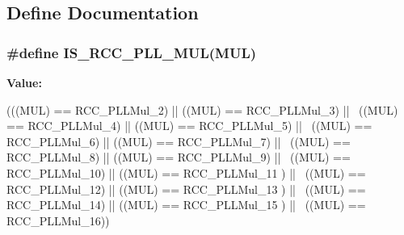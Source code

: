 \subsection{Define Documentation}
\hypertarget{group__PLL__multiplication__factor_gaad04edea77632618678f528dcb2b0cd5}{
\subsubsection[{IS\_\-RCC\_\-PLL\_\-MUL}]{\setlength{\rightskip}{0pt plus 5cm}\#define IS\_\-RCC\_\-PLL\_\-MUL(MUL)}}
\label{group__PLL__multiplication__factor_gaad04edea77632618678f528dcb2b0cd5}
{\bfseries Value:}
\begin{DoxyCode}
(((MUL) == RCC_PLLMul_2) || ((MUL) == RCC_PLLMul_3)   || \
                              ((MUL) == RCC_PLLMul_4) || ((MUL) == RCC_PLLMul_5) 
        || \
                              ((MUL) == RCC_PLLMul_6) || ((MUL) == RCC_PLLMul_7) 
        || \
                              ((MUL) == RCC_PLLMul_8) || ((MUL) == RCC_PLLMul_9) 
        || \
                              ((MUL) == RCC_PLLMul_10) || ((MUL) == RCC_PLLMul_11
      ) || \
                              ((MUL) == RCC_PLLMul_12) || ((MUL) == RCC_PLLMul_13
      ) || \
                              ((MUL) == RCC_PLLMul_14) || ((MUL) == RCC_PLLMul_15
      ) || \
                              ((MUL) == RCC_PLLMul_16))
\end{DoxyCode}
